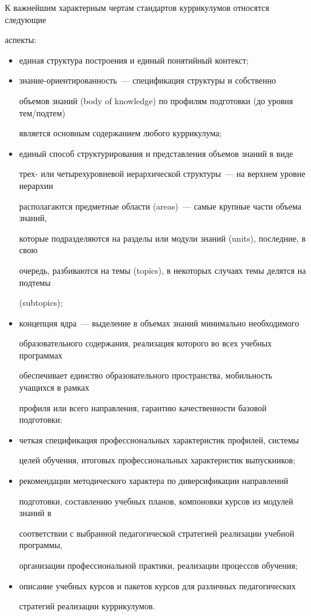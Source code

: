      

      К важнейшим характерным чертам стандартов куррикулумов относятся следующие 

аспекты:

      \begin{itemize}

      \item единая структура построения и единый понятийный контекст;

      \item  знание-ориентированность~--- спецификация структуры и собственно 

объемов знаний (body of knowledge) по профилям подготовки (до уровня тем/подтем) 

является основным содержанием любого куррикулума;

      \item единый способ структурирования и представления объемов знаний в виде 

трех- или четырехуровневой иерархической структуры~--- на верхнем уровне иерархии 

располагаются предметные области (areas)~--- самые крупные части объема знаний, 

которые подразделяются на разделы или модули знаний (units), последние, в свою 

очередь, разбиваются на темы (topics), в некоторых случаях темы делятся на подтемы 

(subtopics);

      \item концепция ядра~--- выделение в объемах знаний минимально необходимого 

образовательного содержания, реализация которого во всех учебных программах 

обеспечивает единство образовательного пространства, мобильность учащихся в рамках 

профиля или всего направления, гарантию качественности базовой подготовки;

      \item четкая спецификация профессиональных характеристик профилей, системы 

целей обучения, итоговых профессиональных характеристик выпускников;

      \item рекомендации методического характера по диверсификации направлений 

подготовки, составлению учебных планов, компоновки курсов из модулей знаний в 

соответствии с выбранной педагогической стратегией реализации учебной программы, 

организации профессиональной практики, реализации процессов обучения;

      \item описание учебных курсов и пакетов курсов для различных педагогических 

стратегий реализации куррикулумов.

      \end{itemize}



